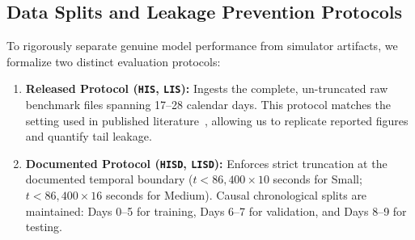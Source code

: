 \documentclass[pdflatex,sn-mathphys,Numbered]{sn-jnl}
\renewenvironment{table*}[1][!htbp]{\begin{tableorg}[#1]\begin{center}\tablebodyfont}{\end{center}\end{tableorg}}
\theoremstyle{thmstyleone}
\theoremstyle{thmstyletwo}
\theoremstyle{thmstylethree}
\begin{document}
\begin{table}[!htbp]
\centering
\small
\caption{\textbf{IBM AMLworld Benchmark Suite: Dataset Characteristics and Cryptographic Hashes.}}
\label{tab:dataset_specifications}
\end{table}

\subsection{Data Splits and Leakage Prevention Protocols}
To rigorously separate genuine model performance from simulator artifacts, we formalize two distinct evaluation protocols:
\begin{enumerate}
    \item \textbf{Released Protocol (\texttt{HIS}, \texttt{LIS}):} Ingests the complete, un-truncated raw benchmark files spanning 17--28 calendar days. This protocol matches the setting used in published literature~\cite{egressy2024multigraph,lin2024fraudgt}, allowing us to replicate reported figures and quantify tail leakage.
    \item \textbf{Documented Protocol (\texttt{HISD}, \texttt{LISD}):} Enforces strict truncation at the documented temporal boundary ($t < 86,400 \times 10$ seconds for Small; $t < 86,400 \times 16$ seconds for Medium). Causal chronological splits are maintained: Days 0--5 for training, Days 6--7 for validation, and Days 8--9 for testing.
\end{enumerate}
\end{document}
